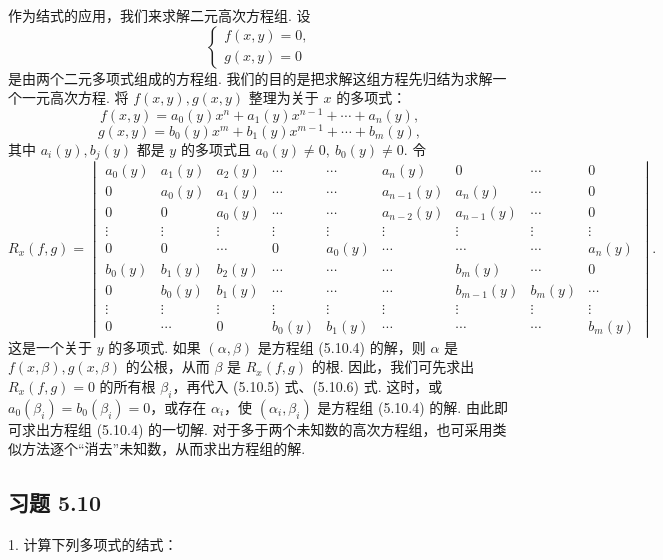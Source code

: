 \documentclass[UTF8, 12pt, fontset=fandol, oneside]{ctexart}
\begin{document}
作为结式的应用，我们来求解二元高次方程组. 设
\begin{equation}
\begin{cases}
f(x,y)=0,\\
g(x,y)=0
\end{cases}
\tag{5.10.4}
\end{equation}
是由两个二元多项式组成的方程组. 我们的目的是把求解这组方程先归结为求解一个一元高次方程. 将 $f(x,y),g(x,y)$ 整理为关于 $x$ 的多项式：
\begin{equation}
f(x,y)=a_0(y)x^n+a_1(y)x^{n-1}+\cdots+a_n(y),
\tag{5.10.5}
\end{equation}
\begin{equation}
g(x,y)=b_0(y)x^m+b_1(y)x^{m-1}+\cdots+b_m(y),
\tag{5.10.6}
\end{equation}
其中 $a_i(y),b_j(y)$ 都是 $y$ 的多项式且 $a_0(y)\neq 0,\ b_0(y)\neq 0$. 令
\[
R_x(f,g)=
\begin{vmatrix}
a_0(y)&a_1(y)&a_2(y)&\cdots&\cdots&a_n(y)&0&\cdots&0\\
0&a_0(y)&a_1(y)&\cdots&\cdots&a_{n-1}(y)&a_n(y)&\cdots&0\\
0&0&a_0(y)&\cdots&\cdots&a_{n-2}(y)&a_{n-1}(y)&\cdots&0\\
\vdots&\vdots&\vdots&\vdots&\vdots&\vdots&\vdots&\vdots&\vdots\\
0&0&\cdots&0&a_0(y)&\cdots&\cdots&\cdots&a_n(y)\\
b_0(y)&b_1(y)&b_2(y)&\cdots&\cdots&\cdots&b_m(y)&\cdots&0\\
0&b_0(y)&b_1(y)&\cdots&\cdots&\cdots&b_{m-1}(y)&b_m(y)&\cdots\\
\vdots&\vdots&\vdots&\vdots&\vdots&\vdots&\vdots&\vdots&\vdots\\
0&\cdots&0&b_0(y)&b_1(y)&\cdots&\cdots&\cdots&b_m(y)
\end{vmatrix}.
\]
这是一个关于 $y$ 的多项式. 如果 $(\alpha,\beta)$ 是方程组 (5.10.4) 的解，则 $\alpha$ 是 $f(x,\beta),g(x,\beta)$ 的公根，从而 $\beta$ 是 $R_x(f,g)$ 的根. 因此，我们可先求出 $R_x(f,g)=0$ 的所有根 $\beta_i$，再代入 (5.10.5) 式、(5.10.6) 式. 这时，或 $a_0(\beta_i)=b_0(\beta_i)=0$，或存在 $\alpha_i$，使 $(\alpha_i,\beta_i)$ 是方程组 (5.10.4) 的解. 由此即可求出方程组 (5.10.4) 的一切解. 对于多于两个未知数的高次方程组，也可采用类似方法逐个“消去”未知数，从而求出方程组的解.

\subsection*{习题 5.10}

1. 计算下列多项式的结式：
\end{document}
